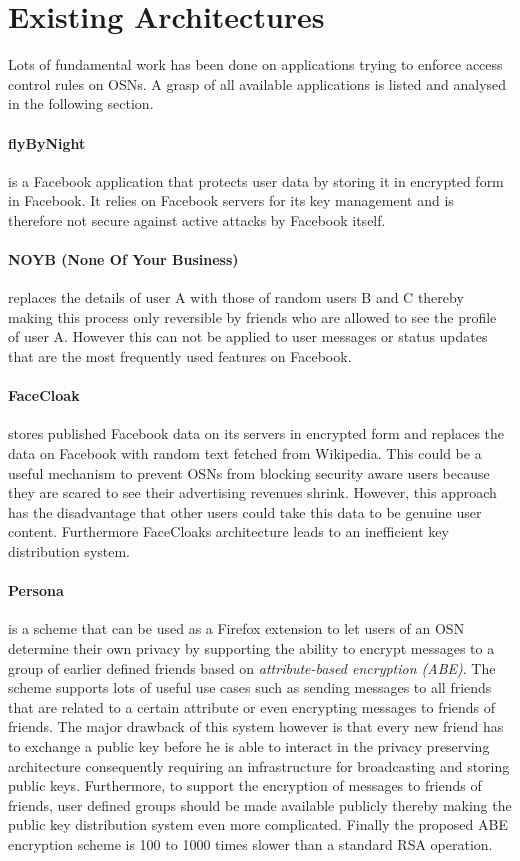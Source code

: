 \documentclass[journal]{IEEEtran}
\begin{document}
\section{Existing Architectures~\cite{BeatoScramble}}
Lots of fundamental work has been done on applications trying to enforce
access control rules on OSNs. A grasp of all available applications is
listed and analysed in the following section.

\paragraph{flyByNight} is a Facebook application that protects user data by
storing it in encrypted form in Facebook. It relies on Facebook servers for its
key management and is therefore not secure against active attacks by Facebook
itself.

\paragraph{NOYB (None Of Your Business)} replaces the details of user A with
those of random users B and C thereby making this process only reversible by
friends who are allowed to see the profile of user A. However this can not be
applied to user messages or status updates that are the most frequently used
features on Facebook.

\paragraph{FaceCloak} stores published Facebook data on its servers in encrypted
form and replaces the data on Facebook with random text fetched from Wikipedia.
This could be a useful mechanism to prevent OSNs from blocking security
aware users because they are scared to see their advertising revenues shrink.
However, this approach has the disadvantage that other users could take this
data to be genuine user content. Furthermore FaceCloaks architecture leads to an
inefficient key distribution system.

\paragraph{Persona} is a scheme that can be used as a Firefox extension to let
users of an OSN determine their own privacy by supporting the ability to encrypt
messages to a group of earlier defined friends based on \textit{attribute-based
encryption (ABE)}\cite{SahaiFuzzyIBE}. The scheme supports lots of useful use
cases such as sending messages to all friends that are related to a certain
attribute or even encrypting messages to friends of friends. The major drawback
of this system however is that every new friend has to exchange a public key
before he is able to interact in the privacy preserving architecture
consequently requiring an infrastructure for broadcasting and storing public
keys. Furthermore, to support the encryption of messages to friends of friends,
user defined groups should be made available publicly thereby making the public
key distribution system even more complicated. Finally the proposed ABE
encryption scheme is 100 to 1000 times slower than a standard RSA operation.
\cite{BadenPersona} 
\end{document}
